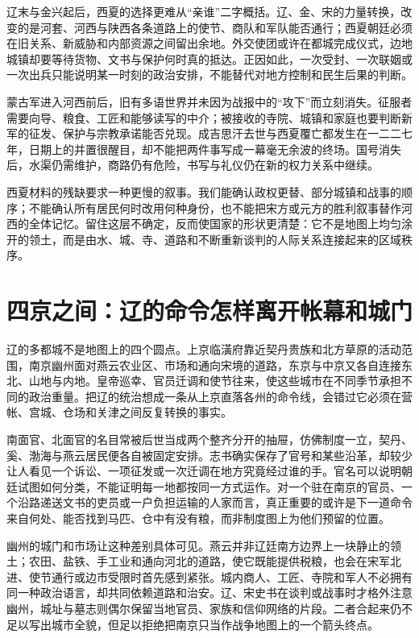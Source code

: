 辽末与金兴起后，西夏的选择更难从“亲谁”二字概括。辽、金、宋的力量转换，改变的是河套、河西与陕西各条道路上的使节、商队和军队能否通行；西夏朝廷必须在旧关系、新威胁和内部资源之间留出余地。外交使团或许在都城完成仪式，边地城镇却要等待货物、文书与保护何时真的抵达。正因如此，一次受封、一次联姻或一次出兵只能说明某一时刻的政治安排，不能替代对地方控制和民生后果的判断。

蒙古军进入河西前后，旧有多语世界并未因为战报中的“攻下”而立刻消失。征服者需要向导、粮食、工匠和能够读写的中介；被接收的寺院、城镇和家庭也要判断新军的征发、保护与宗教承诺能否兑现。成吉思汗去世与西夏覆亡都发生在一二二七年，日期上的并置很醒目，却不能把两件事写成一幕毫无余波的终场。国号消失后，水渠仍需维护，商路仍有危险，书写与礼仪仍在新的权力关系中继续。

西夏材料的残缺要求一种更慢的叙事。我们能确认政权更替、部分城镇和战事的顺序；不能确认所有居民何时改用何种身份，也不能把宋方或元方的胜利叙事替作河西的全体记忆。留住这层不确定，反而使国家的形状更清楚：它不是地图上均匀涂开的领土，而是由水、城、寺、道路和不断重新谈判的人际关系连接起来的区域秩序。

\section{四京之间：辽的命令怎样离开帐幕和城门}

辽的多都城不是地图上的四个圆点。上京临潢府靠近契丹贵族和北方草原的活动范围，南京幽州面对燕云农业区、市场和通向宋境的道路，东京与中京又各自连接东北、山地与内地。皇帝巡幸、官员迁调和使节往来，使这些城市在不同季节承担不同的政治重量。把辽的统治想成一条从上京直落各州的命令线，会错过它必须在营帐、宫城、仓场和关津之间反复转换的事实。

南面官、北面官的名目常被后世当成两个整齐分开的抽屉，仿佛制度一立，契丹、奚、渤海与燕云居民便各自被固定安排。志书确实保存了官号和某些沿革，却较少让人看见一个诉讼、一项征发或一次迁调在地方究竟经过谁的手。官名可以说明朝廷试图如何分类，不能证明每一地都按同一方式运作。对一个驻在南京的官员、一个沿路递送文书的吏员或一户负担运输的人家而言，真正重要的或许是下一道命令来自何处、能否找到马匹、仓中有没有粮，而非制度图上为他们预留的位置。

幽州的城门和市场让这种差别具体可见。燕云并非辽廷南方边界上一块静止的领土；农田、盐铁、手工业和通向河北的道路，使它既能提供税粮，也会在宋军北进、使节通行或边市受限时首先感到紧张。城内商人、工匠、寺院和军人不必拥有同一种政治语言，却共同依赖道路和治安。辽、宋史书在谈判或战事时才格外注意幽州，城址与墓志则偶尔保留当地官员、家族和信仰网络的片段。二者合起来仍不足以写出城市全貌，但足以拒绝把南京只当作战争地图上的一个箭头终点。

